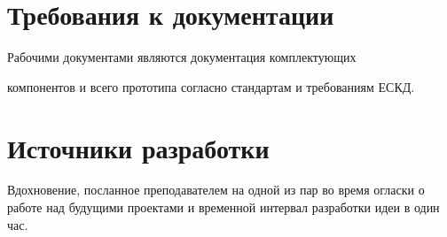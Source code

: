 \documentclass[12pt,a4paper]{scrartcl}
\begin{document}
 	\section{Требования к документации }
 	Рабочими документами являются документация комплектующих
 	
 	компонентов и всего прототипа согласно стандартам и требованиям ЕСКД.
 	
 	\section{Источники разработки }
 	Вдохновение, посланное преподавателем на одной из пар во время огласки о работе над будущими проектами и временной интервал разработки идеи в один час.
 	
 	\vfill
 	
 
\end{document}
